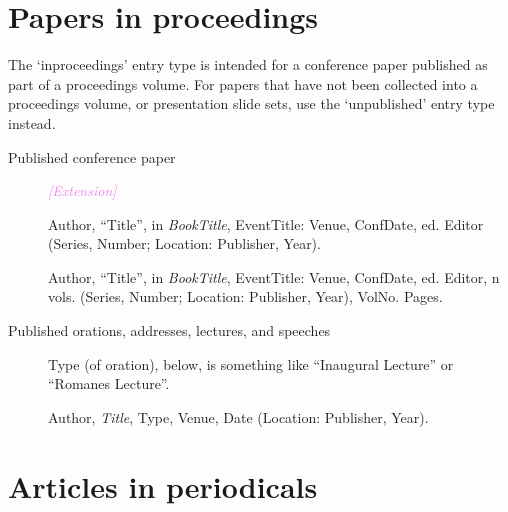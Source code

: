 \documentclass[extrafontsizes,11pt,a4paper,oneside]{memoir}
\newcommand*{\lit}[1]{\textsf{#1}}
\newcommand*{\code}[1]{`\textsf{#1}'}
\newcommand*{\aside}[1]{\textcolor{violet}{\emph{[#1]}}}
\begin{document}
    \section{Papers in proceedings}\label{sec:inproceedings}
    
    The \code{inproceedings} entry type is intended for a conference paper published as part of a proceedings volume. For papers that have not been collected into a proceedings volume, or presentation slide sets, use the \code{unpublished} entry type instead.
    
    \begin{description}
        \item[Published conference paper] \aside{Extension}\par
        Author, \enquote{Title}, \lit{in} \emph{BookTitle}, EventTitle: Venue, ConfDate, \lit{ed.} Editor (Series, Number; Location: Publisher, Year).
        \\\par
        Author, \enquote{Title}, \lit{in} \emph{BookTitle}, EventTitle: Venue, ConfDate, \lit{ed.} Editor, n \lit{vols.} (Series, Number; Location: Publisher, Year), VolNo. Pages.
        \\
        
        \item[Published orations, addresses, lectures, and speeches] Type (of oration), below, is something like \enquote{Inaugural Lecture} or \enquote{Romanes Lecture}.\par Author, \emph{Title}, Type, Venue, Date (Location: Publisher, Year).
        \\
    \end{description}
    
    \section{Articles in periodicals}\label{sec:article}
    
\end{document}

